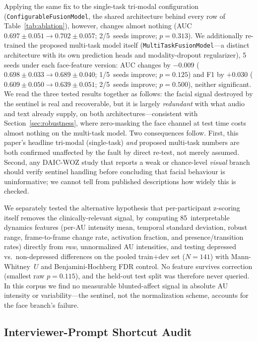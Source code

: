 \documentclass[5p,twocolumn]{elsarticle}
\begin{document}
Applying the same fix to the single-task tri-modal configuration
(\texttt{ConfigurableFusionModel}, the shared architecture behind every
row of Table~\ref{tab:ablation}), however, changes almost nothing
(AUC~$0.697\pm0.051 \to 0.702\pm0.057$; 2/5~seeds improve; $p{=}0.313$).
We additionally re-trained the proposed multi-task model itself
(\texttt{MultiTaskFusionModel}---a distinct architecture with its own
prediction heads and modality-dropout regularizer), 5 seeds under each
face-feature version: AUC changes by $-0.009$ ($0.698\pm0.033 \to
0.689\pm0.040$; 1/5~seeds improve; $p{=}0.125$) and F1 by $+0.030$
($0.609\pm0.050 \to 0.639\pm0.051$; 2/5~seeds improve; $p{=}0.500$),
neither significant. We read the three tested results together as
follows: the facial signal destroyed by the sentinel is real and
recoverable, but it is largely \emph{redundant} with what audio and
text already supply, on both architectures---consistent with
Section~\ref{sec:robustness}, where zero-masking the face channel at
test time costs almost nothing on the multi-task model. Two
consequences follow. First, this paper's headline tri-modal
(single-task) \emph{and} proposed multi-task numbers are both
confirmed unaffected by the fault by direct re-test, not merely
assumed. Second, any DAIC-WOZ study that reports a weak or
chance-level \emph{visual} branch should verify sentinel handling
before concluding that facial behaviour is uninformative; we cannot
tell from published descriptions how widely this is checked.

We separately tested the alternative hypothesis that per-participant
z-scoring itself removes the clinically-relevant signal, by computing
85~interpretable dynamics features (per-AU intensity mean, temporal
standard deviation, robust range, frame-to-frame change rate, activation
fraction, and presence/transition rates) directly from \emph{raw},
unnormalized AU intensities, and testing depressed vs.\ non-depressed
differences on the pooled train$+$dev set ($N{=}141$) with
Mann-Whitney~$U$ and Benjamini-Hochberg FDR control. No feature survives
correction (smallest raw $p{=}0.115$), and the held-out test split was
therefore never queried. In this corpus we find no measurable
blunted-affect signal in absolute AU intensity or variability---the
sentinel, not the normalization scheme, accounts for the face branch's
failure.

\subsection{Interviewer-Prompt Shortcut Audit}
\label{sec:shortcut}
\end{document}
